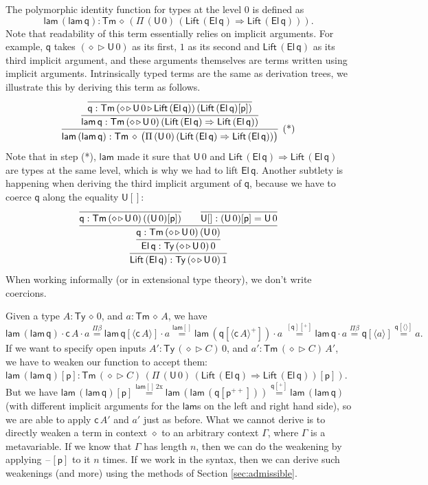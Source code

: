\documentclass[submission,copyright,creativecommons]{eptcs}
\newcommand{\Ra}{\Rightarrow}
\newcommand{\Ty}{\mathsf{Ty}}
\newcommand{\Tm}{\mathsf{Tm}}
\newcommand{\p}{\mathsf{p}}
\newcommand{\q}{\mathsf{q}}
\newcommand{\ext}{\mathop{\triangleright}}
\newcommand{\lam}{\mathsf{lam}}
\newcommand{\U}{\mathsf{U}}
\newcommand{\El}{\mathsf{El}}
\newcommand{\cd}{\mathsf{c}}
\newcommand{\blank}{\mathord{\hspace{1pt}\text{--}\hspace{1pt}}} %
\newcommand{\Lift}{\mathsf{Lift}}
\begin{document}
The polymorphic identity function for types at the level 0 is defined
as
\[
\lam\,(\lam\,\q) : \Tm\,\diamond\,(\Pi\,(\U\,0)\,(\Lift\,(\El\,\q)\Ra\Lift\,(\El\,\q))).
\]
Note that readability of this term essentially relies on implicit
arguments. For example, $\q$ takes $(\diamond\ext\U\,0)$ as its first,
$1$ as its second and $\Lift\,(\El\,\q)$ as its third implicit
argument, and these arguments themselves are terms written using
implicit arguments. Intrinsically typed terms are the same as
derivation trees, we illustrate this by deriving this term as follows.
\[
\infer[\text{(*)}]{\lam\,(\lam\,\q) : \Tm\,\diamond\,\big(\Pi\,(\U\,0)\,(\Lift\,(\El\,\q)\Ra\Lift\,(\El\,\q))\big)}{\infer{\lam\,\q : \Tm\,(\diamond\ext\U\,0)\,(\Lift\,(\El\,\q)\Ra\Lift\,(\El\,\q))}{\infer{\q : \Tm\,(\diamond\ext\U\,0\ext\Lift\,(\El\,\q))\,(\Lift\,(\El\,\q)[\p])}{}}}
\]
Note that in step (*), $\lam$ made it sure that $\U\,0$ and
$\Lift\,(\El\,\q)\Ra\Lift\,(\El\,\q)$ are types at the same level,
which is why we had to lift $\El\,\q$. Another subtlety is
happening when deriving the third implicit argument of $\q$, because we have
to coerce $\q$ along the equality $\U[]$:
\[
\infer{\Lift\,(\El\,\q) : \Ty\,(\diamond\ext\U\,0)\,1}{\infer{\El\,\q : \Ty\,(\diamond\ext\U\,0)\,0}{\infer{\q : \Tm\,(\diamond\ext\U\,0)\,(\U\,0)}{\infer{\q : \Tm\,(\diamond\ext\U\,0)\,((\U\,0)[\p])}{} && \infer{\U[] : (\U\,0)[\p] = \U\,0}{}}}}
\]
When working informally (or in extensional type theory), we don't
write coercions.%

Given a type $A:\Ty\,\diamond\,0$, and $a : \Tm\,\diamond\,A$, we have
$
\lam\,(\lam\,\q)\cdot\cd\,A\cdot a \overset{\Pi\beta}{=}
\lam\,\q[\langle\cd\,A\rangle]\cdot a \overset{\lam[]}{=}
\lam\,(\q[\langle\cd\,A\rangle^+])\cdot a\, \overset{[\q][^+]}{=}
\lam\,\q\cdot a \overset{\Pi\beta}{=}
\q[\langle a\rangle] \overset{\q[\langle\rangle]}{=}
a.
$
If we want to specify open inputs $A':\Ty\,(\diamond\ext C)\,0$, and
$a' : \Tm\,(\diamond\ext C)\,A'$, we have to weaken our function to
accept them:
$
\lam\,(\lam\,\q)[\p] : \Tm\,(\diamond\ext C)\,(\Pi\,(\U\,0)\,(\Lift\,(\El\,\q)\Ra\Lift\,(\El\,\q))[\p]).
$
But we have
$
\lam\,(\lam\,\q)[\p] \overset{\lam[]\,2\text{x}}{=} \lam\,(\lam\,(\q[\p^{++}])) \overset{\q[^+]}{=} \lam\,(\lam\,\q)
$
(with different implicit arguments for the $\lam$s on the left and right hand side), so we are able to apply $\cd\,A'$
and $a'$ just as before. What we cannot derive is to directly weaken a
term in context $\diamond$ to an arbitrary context $\Gamma$, where
$\Gamma$ is a metavariable. If we know that $\Gamma$ has length $n$,
then we can do the weakening by applying $\blank[\p]$ to it $n$ times.
If we work
in the syntax, then we can derive such weakenings (and more) using the
methods of Section \ref{sec:admissible}.
\end{document}
